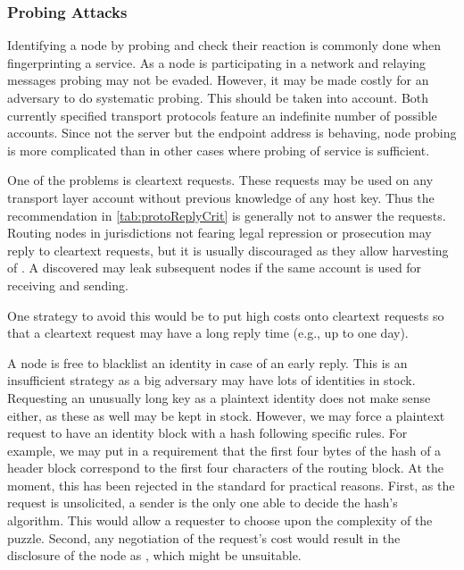 \subsubsection{Probing Attacks}
Identifying a node by probing and check their reaction is commonly done when fingerprinting a service. As a node is participating in a network and relaying messages probing may not be evaded. However, it may be made costly for an adversary to do systematic probing. This should be taken into account. Both currently specified transport protocols feature an indefinite number of possible accounts. Since not the server but the endpoint address is behaving, node probing is more complicated than in other cases where probing of service is sufficient. 

One of the problems is cleartext requests. These requests may be used on any transport layer account without previous knowledge of any host key. Thus the recommendation in \cref{tab:protoReplyCrit} is generally not to answer the requests. Routing nodes in jurisdictions not fearing legal repression or prosecution may reply to cleartext requests, but it is usually discouraged as they allow harvesting of \VortexNodes{}. A discovered \VortexNode{} may leak subsequent nodes if the same account is used for receiving and sending.

One strategy to avoid this would be to put high costs onto cleartext requests so that a cleartext request may have a long reply time (e.g., up to one day). 

A node is free to blacklist an identity in case of an early reply. This is an insufficient strategy as a big adversary may have lots of identities in stock. Requesting an unusually long key as a plaintext identity does not make sense either, as these as well may be kept in stock. However, we may force a plaintext request to have an identity block with a hash following specific rules. For example, we may put in a requirement that the first four bytes of the hash of a header block correspond to the first four characters of the routing block. At the moment, this has been rejected in the standard for practical reasons. First, as the request is unsolicited, a sender is the only one able to decide the hash's algorithm. This would allow a requester to choose upon the complexity of the puzzle. Second, any negotiation of the request's cost would result in the disclosure of the node as \VortexNode, which might be unsuitable.

